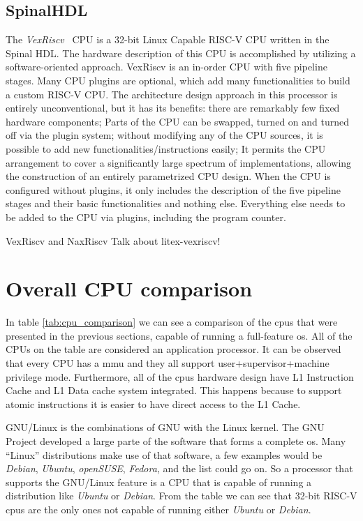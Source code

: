 \subsection{SpinalHDL}
The \textit{VexRiscv}~\cite{vexriscv} CPU is a 32-bit Linux Capable RISC-V CPU written in the Spinal HDL. The hardware description of this CPU is accomplished by utilizing a software-oriented approach. VexRiscv is an in-order CPU with five pipeline stages. Many CPU plugins are optional, which add many functionalities to build a custom RISC-V CPU. The architecture design approach in this processor is entirely unconventional, but it has its benefits: there are remarkably few fixed hardware components; Parts of the CPU can be swapped, turned on and turned off via the plugin system; without modifying any of the CPU sources, it is possible to add new functionalities/instructions easily; It permits the CPU arrangement to cover a significantly large spectrum of implementations, allowing the construction of an entirely parametrized CPU design. When the CPU is configured without plugins, it only includes the description of the five pipeline stages and their basic functionalities and nothing else. Everything else needs to be added to the CPU via plugins, including the program counter.

VexRiscv and NaxRiscv
Talk about litex-vexriscv!


\section{Overall CPU comparison}
In table \ref*{tab:cpu_comparison} we can see a comparison of the \acrshort{cpu}s that were presented in the previous sections, capable of running a full-feature \acrfull{os}. All of the CPUs on the table are considered an application processor. It can be observed that every CPU has a \acrfull{mmu} and they all support \acrshort{user}+\acrshort{supervisor}+\acrshort{machine} privilege mode. Furthermore, all of the \acrshort{cpu}s hardware design have L1 Instruction Cache and L1 Data cache system integrated. This happens because to support atomic instructions it is easier to have direct access to the L1 Cache.

GNU/Linux is the combinations of GNU with the Linux kernel. The GNU Project developed a large parte of the software that forms a complete \acrfull{os}. Many “Linux” distributions make use of that software, a few examples would be \textit{Debian}, \textit{Ubuntu}, \textit{openSUSE}, \textit{Fedora}, and the list could go on. So a processor that supports the GNU/Linux feature is a CPU that is capable of running a distribution like \textit{Ubuntu} or \textit{Debian}. From the table we can see that 32-bit RISC-V \acrshort{cpu}s are the only ones not capable of running either \textit{Ubuntu} or \textit{Debian}.

